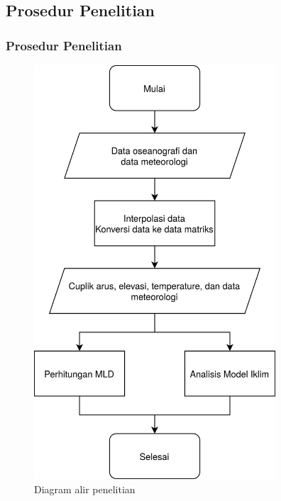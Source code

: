 \documentclass{beamer}
\begin{document}
\subsection{Prosedur Penelitian}
\begin{frame}
	\frametitle{Prosedur Penelitian}
	\begin{figure}[H]
		\centering
		\includegraphics[width=9cm]{flowchart.png}
		\caption{Diagram alir penelitian}
		\label{fig:flowchart}
	\end{figure}
\end{frame}
\ThankYouFrame
\end{document}
